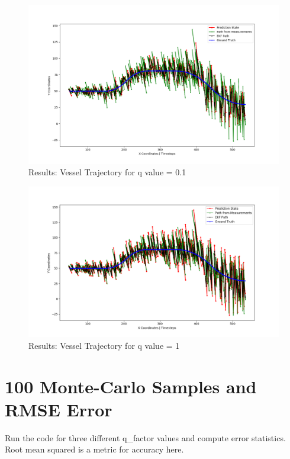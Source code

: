 \documentclass[12pt]{article}
\begin{document}
\begin{figure}[]
\centering
\includegraphics[width=\textwidth]{../results/path_q0_1.png}
\caption{Results: Vessel Trajectory for q value = 0.1}
\label{fig:EKF_2}
\end{figure}

\begin{figure}[]
\centering
\includegraphics[width=\textwidth]{../results/path_q1.png}
\caption{Results: Vessel Trajectory for q value = 1}
\label{fig:EKF_3}
\end{figure}
  
  
  

\section{100 Monte-Carlo Samples and RMSE Error}
Run the code for three different q\_factor values and compute error statistics. Root mean squared is a metric for accuracy here. \\
\end{document}
